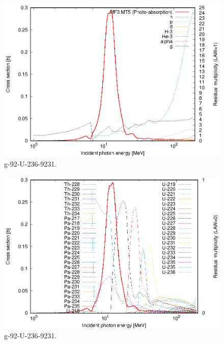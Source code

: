 \begin{figure}
 \includegraphics[width=\linewidth]{eps/g_92-U-236_9231.eps}
  \caption{g-92-U-236-9231.}
\end{figure}
\begin{figure}
 \includegraphics[width=\linewidth]{eps-law0/g_92-U-236_9231.eps}
 \caption{g-92-U-236-9231.}
\end{figure}
\newpage \clearpage

